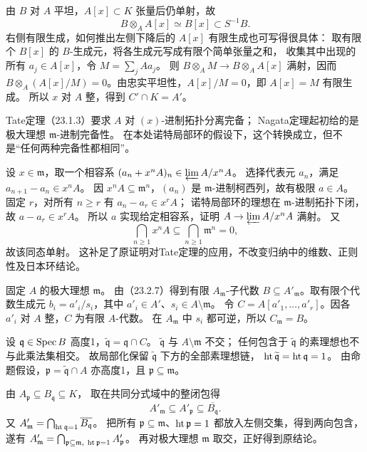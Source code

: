 由 $B$ 对 $A$ 平坦，$A[x]\subset K$ 张量后仍单射，故
\[
 B\otimes_A A[x]\simeq B[x]\subset S^{-1}B.
\]
右侧有限生成，如何推出左侧下降后的 $A[x]$ 有限生成也可写得很具体：
取有限个 $B[x]$ 的 $B$-生成元，将各生成元写成有限个简单张量之和，
收集其中出现的所有 $a_j\in A[x]$，令 $M=\sum_jAa_j$。
则 $B\otimes_AM\to B\otimes_AA[x]$ 满射，因而
$B\otimes_A(A[x]/M)=0$。由忠实平坦性，$A[x]/M=0$，即 $A[x]=M$ 有限生成。
所以 $x$ 对 $A$ 整，得到 $C'\cap K=A'$。

Tate定理（23.1.3）要求 $A$ 对 $(x)$-进制拓扑分离完备；
Nagata定理起初给的是极大理想 $\mathfrak m$-进制完备性。
在本处诺特局部环的假设下，这个转换成立，但不是“任何两种完备性都相同”。

设 $x\in\mathfrak m$，取一个相容系 $(a_n+x^nA)_n\in\varprojlim A/x^nA$。
选择代表元 $a_n$，满足 $a_{n+1}-a_n\in x^nA$。
因 $x^nA\subseteq\mathfrak m^n$，$(a_n)$ 是 $\mathfrak m$-进制柯西列，故有极限 $a\in A$。
固定 $r$，对所有 $n\ge r$ 有 $a_n-a_r\in x^rA$；
诺特局部环的理想在 $\mathfrak m$-进制拓扑下闭，故 $a-a_r\in x^rA$。
所以 $a$ 实现给定相容系，证明 $A\to\varprojlim A/x^nA$ 满射。
又
\[
 \bigcap_{n\ge1}x^nA\subseteq\bigcap_{n\ge1}\mathfrak m^n=0,
\]
故该同态单射。
这补足了原证明对Tate定理的应用，不改变归纳中的维数、正则性及日本环结论。

固定 $A$ 的极大理想 $\mathfrak m$。
由（23.2.7）得到有限 $A_{\mathfrak m}$-子代数
$B\subseteq A'_{\mathfrak m}$。取有限个代数生成元
$b_i=a'_i/s_i$，其中 $a'_i\in A'$、$s_i\in A\setminus\mathfrak m$。
令 $C=A[a'_1,\ldots,a'_r]$。因各 $a'_i$ 对 $A$ 整，$C$ 为有限 $A$-代数。
在 $A_{\mathfrak m}$ 中 $s_i$ 都可逆，所以 $C_{\mathfrak m}=B$。

设 $\mathfrak q\in\operatorname{Spec} B$ 高度1，$\widetilde{\mathfrak q}=\mathfrak q\cap C$。
$\widetilde{\mathfrak q}$ 与 $A\setminus\mathfrak m$ 不交；
任何包含于 $\widetilde{\mathfrak q}$ 的素理想也不与此乘法集相交。
故局部化保留 $\widetilde{\mathfrak q}$ 下方的全部素理想链，
$\operatorname{ht}\widetilde{\mathfrak q}=\operatorname{ht}\mathfrak q=1$。
由命题假设，$\mathfrak p=\widetilde{\mathfrak q}\cap A$ 亦高度1，且 $\mathfrak p\subseteq\mathfrak m$。

由 $A_{\mathfrak p}\subseteq B_{\mathfrak q}\subseteq K$，
取在共同分式域中的整闭包得
\[
 A'_{\mathfrak m}\subseteq A'_{\mathfrak p}\subseteq\overline{B_{\mathfrak q}}.
\]
又 $A'_{\mathfrak m}=\bigcap_{\operatorname{ht}\mathfrak q=1}\overline{B_{\mathfrak q}}$。
把所有 $\mathfrak p\subseteq\mathfrak m$、$\operatorname{ht}\mathfrak p=1$ 都放入左侧交集，得到两向包含，
遂有 $A'_{\mathfrak m}=\bigcap_{\mathfrak p\subseteq\mathfrak m,\ \operatorname{ht}\mathfrak p=1}A'_{\mathfrak p}$。
再对极大理想 $\mathfrak m$ 取交，正好得到原结论。

